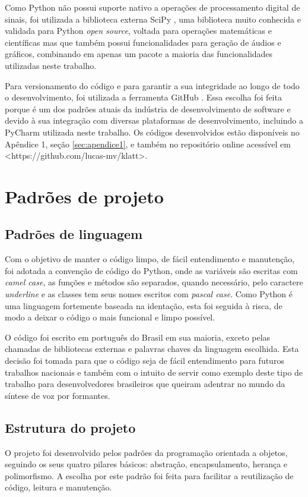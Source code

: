 \documentclass[
  12pt,       
  openright,      
  twoside,      
  a4paper,      
  english,      
  french,       
  spanish,      
  brazil,     
  ]{abntex2}
\begin{document}
Como Python não possui suporte nativo a operações de processamento digital de sinais, foi utilizada a biblioteca externa SciPy \cite{scipy}, uma biblioteca muito conhecida e validada para Python \textit{open source}, voltada para operações matemáticas e científicas mas que também possui funcionalidades para geração de áudios e gráficos, combinando em apenas um pacote a maioria das funcionalidades utilizadas neste trabalho.

Para versionamento do código e para garantir a sua integridade ao longo de todo o desenvolvimento, foi utilizada a ferramenta GitHub \cite{github}. Essa escolha foi feita porque é um dos padrões atuais da indústria de desenvolvimento de software e devido à sua integração com diversas plataformas de desenvolvimento, incluindo a PyCharm \cite{pycharm} utilizada neste trabalho. Os códigos desenvolvidos estão disponíveis no Apêndice 1, seção \ref{sec:apendice1}, e também no repositório online acessível em <https://github.com/lucas-mv/klatt>.

\section{Padrões de projeto}
\label{subsec:padroesProjeto}
\subsection{Padrões de linguagem}
Com o objetivo de manter o código limpo, de fácil entendimento e manutenção, foi adotada a convenção de código do Python, onde as variáveis são escritas com \textit{camel case}, as funções e métodos são separados, quando necessário, pelo caractere \textit{underline} e as classes tem seus nomes escritos com \textit{pascal case}. Como Python é uma linguagem fortemente baseada na identação, esta foi seguida à risca, de modo a deixar o código o mais funcional e limpo possível.

O código foi escrito em português do Brasil em sua maioria, exceto pelas chamadas de bibliotecas externas e palavras chaves da linguagem escolhida. Esta decisão foi tomada para que o código seja de fácil entendimento para futuros trabalhos nacionais e também com o intuito de servir como exemplo deste tipo de trabalho para desenvolvedores brasileiros que queiram adentrar no mundo da síntese de voz por formantes.

\subsection{Estrutura do projeto}
O projeto foi desenvolvido pelos padrões da programação orientada a objetos, seguindo os seus quatro pilares básicos: abstração, encapsulamento, herança e polimorfismo. A escolha por este padrão foi feita para facilitar a reutilização de código, leitura e manutenção.
\end{document}
